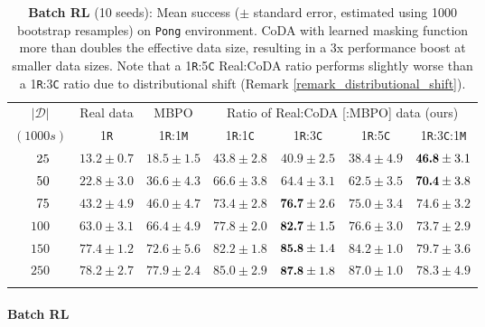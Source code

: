 \documentclass{article}
\newcommand{\mybm}[1]{\scalebox{0.9}[1]{$\bm{#1}$}}
\begin{document}
{\small
\begin{table}[t]
\newcommand{\smol}[1]{{\scriptsize\texttt{#1}}}
\centering\small
\begin{tabular}{c@{\hskip 0.2in}cc@{\hskip 0.16in}|@{\hskip 0.16in}cccc}
	\toprule
$|\mathcal{D}|$	&Real data& MBPO&
\multicolumn{4}{c}{Ratio of Real:CoDA [:MBPO] data (ours)}\\
$(1000s)$ &   1\smol{R}  &   1\smol{R}:1\smol{M} &  1\smol{R}:1\smol{C}  &  1\smol{R}:3\smol{C}  &  1\smol{R}:5\smol{C} & 1\smol{R}:3\smol{C}:1\smol{M} \\
	\midrule
$\hphantom{0}25$ & $13.2 \pm 0.7$  & $18.5 \pm 1.5$  & $43.8 \pm 2.8$  & $40.9 \pm 2.5$  & $38.4 \pm 4.9$  & $\mybm{46.8} \pm 3.1$  \\
$\hphantom{0}50$ & $22.8 \pm 3.0$  & $36.6 \pm 4.3$  & $66.6 \pm 3.8$  & $64.4 \pm 3.1$  & $62.5 \pm 3.5$  & $\mybm{70.4} \pm 3.8$  \\
$\hphantom{0}75$ & $43.2 \pm 4.9$  & $46.0 \pm 4.7$  & $73.4 \pm 2.8$  & $\mybm{76.7} \pm 2.6$  & $75.0 \pm 3.4$  & $74.6 \pm 3.2$  \\
$100$ & $63.0 \pm 3.1$  & $66.4 \pm 4.9$  & $77.8 \pm 2.0$  & $\mybm{82.7} \pm 1.5$  & $76.6 \pm 3.0$  & $73.7 \pm 2.9$  \\
$150$ & $77.4 \pm 1.2$  & $72.6 \pm 5.6$  & $82.2 \pm 1.8$  & $\mybm{85.8} \pm 1.4$  & $84.2 \pm 1.0$  & $79.7 \pm 3.6$  \\
$250$ & $78.2 \pm 2.7$  & $77.9 \pm 2.4$  & $85.0 \pm 2.9$  & $\mybm{87.8} \pm 1.8$  & $87.0 \pm 1.0$  & $78.3 \pm 4.9$  \\
	\bottomrule
	\vspace{-0.12in}
\end{tabular}
\caption{\textbf{Batch RL} (10 seeds): Mean success ($\pm$ standard error, estimated using 1000 bootstrap resamples) on \texttt{Pong} environment. CoDA with learned masking function more than doubles the effective data size, resulting in a 3x performance boost at smaller data sizes. Note that a 1\smol{R}:5\smol{C} Real:CoDA ratio performs slightly worse than a 1\smol{R}:3\smol{C} ratio due to distributional shift (Remark \ref{remark_distributional_shift}).
}\label{fig_batch_rl_and_fetch}
\vspace{-\baselineskip}
\end{table}
}

\paragraph{Batch RL}
\end{document}
